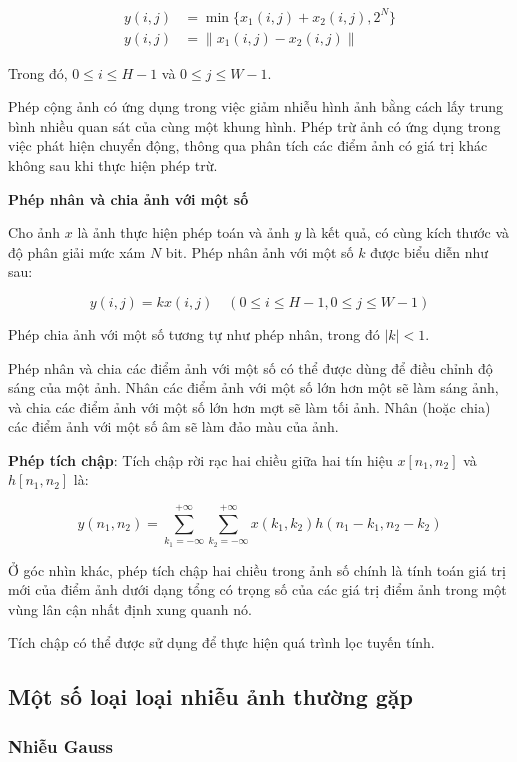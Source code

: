 \begin{align}
    y(i,j) &= \min \{ x_1(i,j) + x_2(i,j), 2^N \} \\
    y(i,j) &= \| x_1(i,j) - x_2(i,j) \|
\end{align}

Trong đó, $0 \leq i \leq H-1$ và $0 \leq j \leq W-1$.

Phép cộng ảnh có ứng dụng trong việc giảm nhiễu hình ảnh bằng cách lấy trung bình nhiều quan sát của cùng một khung hình. 
Phép trừ ảnh có ứng dụng trong việc phát hiện chuyển động, thông qua phân tích các điểm ảnh có giá trị khác không sau khi thực hiện phép trừ.

\textbf{Phép nhân và chia ảnh với một số}

Cho ảnh $x$ là ảnh thực hiện phép toán và ảnh $y$ là kết quả, có cùng kích thước và độ phân giải mức xám $N$ bit.
Phép nhân ảnh với một số $k$ được biểu diễn như sau:

\begin{equation}
    y(i,j) = k x(i,j) \quad (0 \leq i \leq H-1, 0 \leq j \leq W-1)
\end{equation}

Phép chia ảnh với một số tương tự như phép nhân, trong đó $|k| < 1$.

Phép nhân và chia các điểm ảnh với một số có thể được dùng để điều chỉnh độ sáng của một ảnh. Nhân các điểm ảnh với một số lớn hơn một sẽ làm sáng ảnh, và chia các điểm ảnh với một số lớn hơn mợt sẽ làm tối ảnh. Nhân (hoặc chia) các điểm ảnh với một số âm sẽ làm đảo màu của ảnh.

\textbf{Phép tích chập}: Tích chập rời rạc hai chiều giữa hai tín hiệu $x[n_1, n_2]$ và $h[n_1, n_2]$ là: 

$$y(n_1,n_2) = \sum_{k_1 = -\infty}^{+\infty} \sum_{k_2 = -\infty}^{+\infty} x(k_1,k_2) h(n_1-k_1, n_2-k_2)$$

Ở góc nhìn khác, phép tích chập hai chiều trong ảnh số chính là tính toán giá trị mới của điểm ảnh dưới dạng tổng có trọng số của các giá trị điểm ảnh trong một vùng lân cận nhất định xung quanh nó.

Tích chập có thể được sử dụng để thực hiện quá trình lọc tuyến tính.

\subsection{Một số loại loại nhiễu ảnh thường gặp}

\subsubsection{Nhiễu Gauss}

